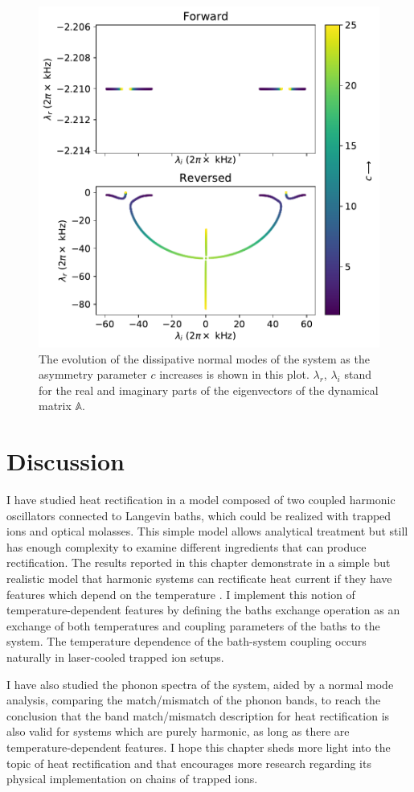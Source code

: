 \begin{figure}
  \center
  \includegraphics[width=0.75\linewidth]{Figures/Eigenvals_NormalModes.pdf}
  \caption{The evolution of the dissipative normal modes of the system as the asymmetry parameter $c$ increases is shown in this plot. $\lambda_r$, $\lambda_i$ stand for the real and imaginary parts of the eigenvectors of the dynamical matrix $\mathbb{A}$.}
  \label{fig:Figure_Eigenvals_NormalModes}
\end{figure}


%
\section{Discussion \label{sec:chapter6_Discussion}}
%
I have studied heat rectification in a model composed of two coupled harmonic oscillators connected to Langevin baths, which could be realized with trapped ions and optical molasses. This simple model allows analytical treatment but still has enough complexity to examine different ingredients that can produce rectification. The results reported in this chapter demonstrate in a simple but realistic model that harmonic systems can rectificate heat current if they have features which depend on the temperature  \cite{Pereira2017}. I implement this notion of temperature-dependent features by defining the baths exchange operation as an exchange of both temperatures and coupling parameters of the baths to the system. The temperature dependence of the bath-system coupling  occurs naturally in laser-cooled trapped ion setups.

I have also studied the phonon spectra of the system, aided by a normal mode analysis,
comparing the match/mismatch of the phonon bands, to reach the conclusion that the band match/mismatch description for heat rectification is also valid for systems which are purely harmonic, as long as there are temperature-dependent features.
I hope this chapter sheds more light into the topic of heat rectification and that encourages more research regarding its physical implementation on chains of trapped ions.
